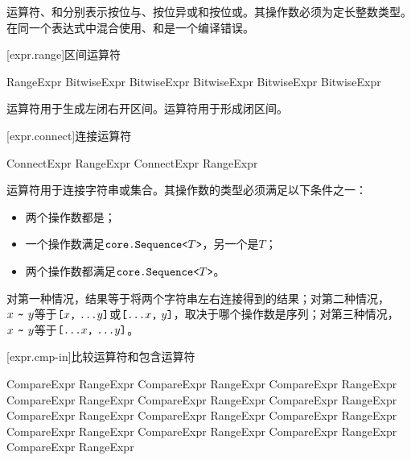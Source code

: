 \pnum
运算符、和分别表示按位与、按位异或和按位或。其操作数必须为定长整数类型。在同一个表达式中混合使用、和是一个编译错误。

[expr.range]{区间运算符}

\begin{bnf}{RangeExpr}
    BitwiseExpr \br
    BitwiseExpr  BitwiseExpr
    BitwiseExpr  BitwiseExpr
\end{bnf}

\pnum
运算符用于生成左闭右开区间。运算符用于形成闭区间。

[expr.connect]{连接运算符}

\begin{bnf}{ConnectExpr}
    RangeExpr \br
    ConnectExpr \terminal{\~} RangeExpr
\end{bnf}

\pnum
运算符\tcode{\~}用于连接字符串或集合。其操作数的类型必须满足以下条件之一：

\begin{itemize}
    \item 两个操作数都是；
    \item 一个操作数满足$\texttt{core.Sequence<}T\texttt{>}$，另一个是$T$；
    \item 两个操作数都满足$\texttt{core.Sequence<}T\texttt{>}$。
\end{itemize}

对第一种情况，结果等于将两个字符串左右连接得到的结果；对第二种情况，$x\ \tcode{\~}\ y$等于$\tcode{[}x\tcode{,}\ \tcode{...}y\tcode{]}$或$\tcode{[...}x\tcode{,}\ y\tcode{]}$，取决于哪个操作数是序列；对第三种情况，$x\ \tcode{\~}\ y$等于$\tcode{[...}x\tcode{,}\ \tcode{...}y\tcode{]}$。

[expr.cmp-in]{比较运算符和包含运算符}

\begin{bnf}{CompareExpr}
    RangeExpr \br
    CompareExpr \terminal{==} RangeExpr \br
    CompareExpr \terminal{!=} RangeExpr \br
    CompareExpr \terminal{<} RangeExpr \br
    CompareExpr \terminal{!<} RangeExpr \br
    CompareExpr \terminal{>} RangeExpr \br
    CompareExpr \terminal{!>} RangeExpr \br
    CompareExpr \terminal{<=} RangeExpr \br
    CompareExpr \terminal{>=} RangeExpr \br
    CompareExpr \terminal{<>} RangeExpr \br
    CompareExpr  RangeExpr \br
    CompareExpr  RangeExpr \br
    CompareExpr \terminal{!}  RangeExpr
\end{bnf}

